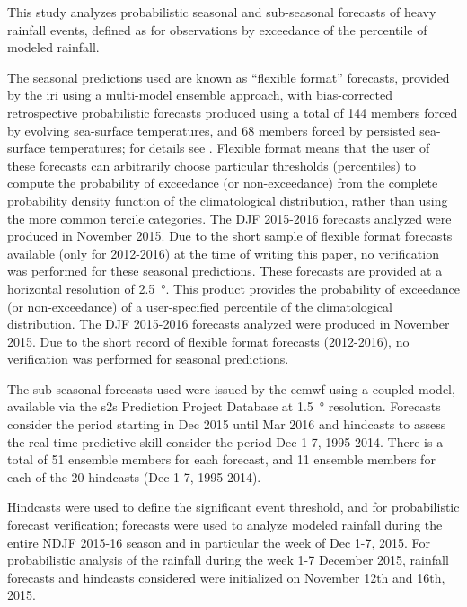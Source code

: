 \documentclass[twocol]{ametsoc}
\begin{document}
This study analyzes probabilistic seasonal and sub-seasonal forecasts of heavy rainfall events, defined as for observations by exceedance of the  percentile of modeled rainfall.

The seasonal predictions used  are known as ``flexible format'' forecasts, provided by the \gls{iri} using a multi-model ensemble approach, with bias-corrected retrospective probabilistic forecasts produced using a total of 144 members forced by evolving sea-surface temperatures, and 68 members forced by persisted sea-surface temperatures; for details see \citet{Barnston2010}.
Flexible format means that the user of these forecasts can arbitrarily choose  particular thresholds (percentiles) to compute the  probability of exceedance (or non-exceedance) from the complete  probability density function of the climatological distribution,  rather than using the more common tercile categories.
The DJF 2015-2016 forecasts analyzed were produced in  November 2015.
Due to the short sample of flexible format forecasts available (only for 2012-2016) at the time of writing  this paper, no verification was performed for these seasonal predictions.
These forecasts are provided at a horizontal  resolution of \SI{2.5}{\degree}.
This product provides the probability of exceedance (or non-exceedance) of a user-specified percentile of the climatological distribution.
The DJF 2015-2016 forecasts analyzed were produced in November 2015.
Due to the short record of flexible format forecasts (2012-2016), no verification was performed for seasonal predictions.


The sub-seasonal forecasts used were issued by the \gls{ecmwf} using a coupled model, available via the \gls{s2s} Prediction Project Database \citep{Vitart2016} at \SI{1.5}{\degree} resolution.
Forecasts consider the period starting in Dec 2015 until Mar 2016 and hindcasts to assess the real-time predictive skill consider the period Dec 1-7, 1995-2014.
There is a total of 51 ensemble members for each forecast, and 11 ensemble members for each of the 20 hindcasts (Dec 1-7, 1995-2014).

Hindcasts were used to define the significant event threshold, and for probabilistic forecast verification; forecasts were used to analyze modeled rainfall during the entire NDJF 2015-16 season and in particular the week of Dec 1-7, 2015.
For probabilistic analysis of the rainfall during the week 1-7 December 2015, rainfall forecasts and hindcasts considered were initialized on November 12th and 16th, 2015.
\end{document}
